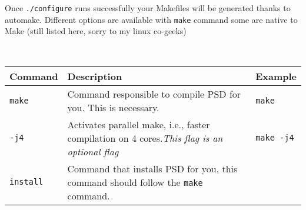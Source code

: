 Once \lstinline!./configure! runs successfully your Makefiles will be
generated thanks to automake. Different options are available with
\lstinline!make! command some are native to Make (still listed here,
sorry to my linux co-geeks)

​

\begin{longtable}[]{@{}lll@{}}
\toprule
\begin{minipage}[b]{0.15\columnwidth}\raggedright\strut
\textbf{Command}\strut
\end{minipage} & \begin{minipage}[b]{0.47\columnwidth}\raggedright\strut
\textbf{Description}\strut
\end{minipage} & \begin{minipage}[b]{0.30\columnwidth}\raggedright\strut
\textbf{Example}\strut
\end{minipage}\tabularnewline
\midrule
\endhead
\begin{minipage}[t]{0.15\columnwidth}\raggedright\strut
\lstinline!make!\strut
\end{minipage} & \begin{minipage}[t]{0.47\columnwidth}\raggedright\strut
Command responsible to compile PSD for you. This is necessary.\strut
\end{minipage} & \begin{minipage}[t]{0.30\columnwidth}\raggedright\strut
\lstinline!make!\strut
\end{minipage}\tabularnewline
\begin{minipage}[t]{0.15\columnwidth}\raggedright\strut
\lstinline!-j4!\strut
\end{minipage} & \begin{minipage}[t]{0.47\columnwidth}\raggedright\strut
Activates parallel make, i.e., faster compilation on 4 cores.\emph{This
flag is an optional flag}\strut
\end{minipage} & \begin{minipage}[t]{0.30\columnwidth}\raggedright\strut
\lstinline!make -j4!\strut
\end{minipage}\tabularnewline
\begin{minipage}[t]{0.15\columnwidth}\raggedright\strut
\lstinline!install!\strut
\end{minipage} & \begin{minipage}[t]{0.47\columnwidth}\raggedright\strut
Command that installs PSD for you, this command should follow the
\lstinline!make! command.\strut
\end{minipage} & \begin{minipage}[t]{0.30\columnwidth}\raggedright\strut

\end{minipage}
\end{longtable}
